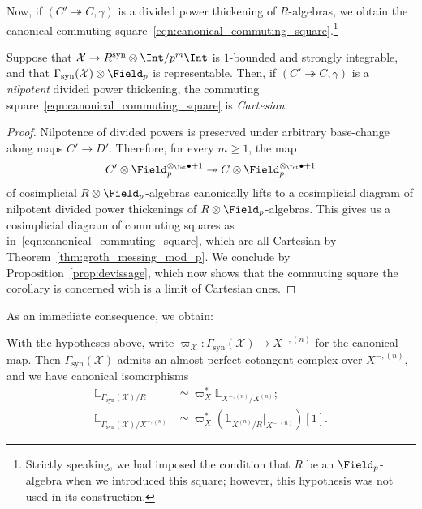 \documentclass[10pt]{amsart}
\begin{document}
Now, if $(C'\twoheadrightarrow C,\gamma)$ is a divided power thickening of $R$-algebras, we obtain the canonical commuting square~\eqref{eqn:canonical_commuting_square}.\footnote{Strictly speaking, we had imposed the condition that $R$ be an $\Field_p$-algebra when we introduced this square; however, this hypothesis was not used in its construction.}
\begin{corollary}
\label{cor:groth_messing}
Suppose that $\mathcal{X}\to R^{\mathrm{syn}}\otimes\Int/p^m\Int$ is $1$-bounded and strongly integrable, and that $\Gamma_{\mathrm{syn}}(\mathcal{X})\otimes\Field_p$ is representable. Then, if $(C'\twoheadrightarrow C,\gamma)$ is a \emph{nilpotent} divided power thickening, the commuting square~\eqref{eqn:canonical_commuting_square} is \emph{Cartesian}.
\end{corollary}
\begin{proof}
Nilpotence of divided powers is preserved under arbitrary base-change along maps $C'\to D'$. Therefore, for every $m\ge 1$, the map 
\[
C'\otimes\Field_p^{\otimes_{\Int}\bullet +1}\twoheadrightarrow C\otimes\Field_p^{\otimes_{\Int}\bullet + 1}
\]
of cosimplicial $R\otimes\Field_p$-algebras canonically lifts to a cosimplicial diagram of nilpotent divided power thickenings of $R\otimes\Field_p$-algebras. This gives us a cosimplicial diagram of commuting squares as in~\eqref{eqn:canonical_commuting_square}, which are all Cartesian by Theorem~\ref{thm:groth_messing_mod_p}. We conclude by Proposition~\ref{prop:devissage}, which now shows that the commuting square the corollary is concerned with is a limit of Cartesian ones.
\end{proof}

As an immediate consequence, we obtain:
\begin{corollary}
\label{cor:cotangent_complex}
With the hypotheses above, write $\varpi_{\mathcal{X}}:\Gamma_{\mathrm{syn}}(\mathcal{X})\to X^{-,(n)}$ for the canonical map. Then $\Gamma_{\mathrm{syn}}(\mathcal{X})$ admits an almost perfect cotangent complex over $X^{-,(n)}$, and we have canonical isomorphisms
\begin{align*}
\mathbb{L}_{\Gamma_{\mathrm{syn}}(\mathcal{X})/R}&\simeq \varpi_X^*\mathbb{L}_{X^{-,(n)}/X^{(n)}};\\
\mathbb{L}_{\Gamma_{\mathrm{syn}}(\mathcal{X})/X^{-,(n)}}&\simeq \varpi_X^*\left(\mathbb{L}_{X^{(n)}/R}\vert_{X^{-,(n)}}\right)[1].
\end{align*}
\end{corollary}
\end{document}
